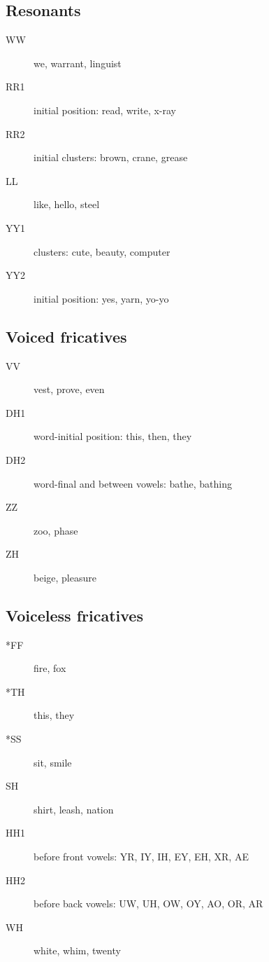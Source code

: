 \subsection{Resonants}
\begin{description}
\item[WW] we, warrant, linguist
\item[RR1] initial position: read, write, x-ray
\item[RR2] initial clusters: brown, crane, grease
\item[LL] like, hello, steel
\item[YY1] clusters: cute, beauty, computer
\item[YY2] initial position: yes, yarn, yo-yo
\end{description}

\subsection{Voiced fricatives}
\begin{description}
\item[VV] vest, prove, even
\item[DH1] word-initial position: this, then, they
\item[DH2] word-final and between vowels: bathe, bathing
\item[ZZ] zoo, phase
\item[ZH] beige, pleasure
\end{description}

\subsection{Voiceless fricatives}
\begin{description}
\item[*FF] fire, fox
\item[*TH] this, they
\item[*SS] sit, smile
\item[SH] shirt, leash, nation
\item[HH1] before front vowels: YR, IY, IH, EY, EH, XR, AE
\item[HH2] before back vowels: UW, UH, OW, OY, AO, OR, AR
\item[WH] white, whim, twenty
\end{description}

